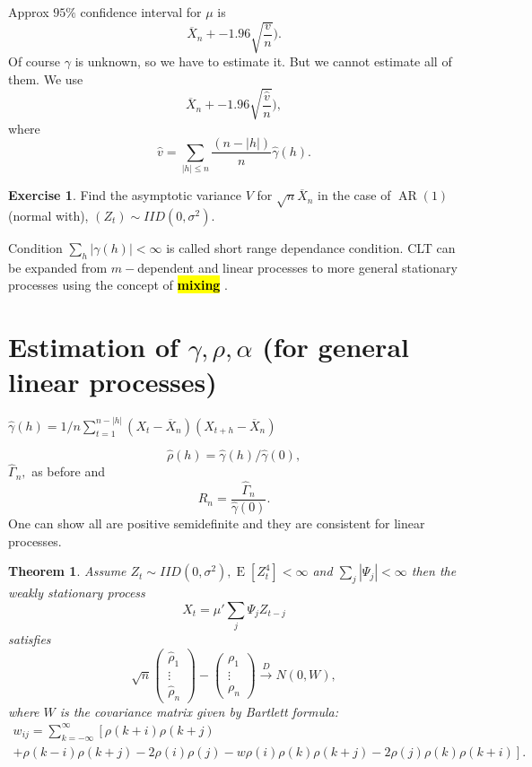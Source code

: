 \documentclass[12pt,a4paper, notitlepage]{book}
\newcommand{\hlc}[2][yellow]{ {\sethlcolor{#1} \hl{#2}} }
\newcommand{\hlcr}[1]{\hlc[lightred]{#1}}
\theoremstyle{definition} %
\newtheorem{exercise}{Exercise}[chapter]
\theoremstyle{plain} %
\newtheorem{theorem}{Theorem}
\DeclareMathOperator{\E}{E}
\DeclareMathOperator{\Ar}{AR}
\newcommand{\New}[1]{ {\bf \hlcr{#1} } }
\begin{document}
Approx $95\%$ confidence interval for $\mu$ is 
\[ \overline{X}_n +- 1.96 \sqrt{\frac{v}{n}}). \]
 Of course $\gamma$ is unknown, so we have to estimate it. But we cannot estimate all of them.
 We use 
\[ \overline{X}_n +- 1.96 \sqrt{\frac{\hat{v}}{n}}) , \]
 where  
\[ \hat{v} = \sum_{|h| \leq n} \frac{(n - |h|)}{n}\hat{\gamma}(h). \]


\begin{exercise}
Find the asymptotic variance $V$ for $\sqrt{n} \overline{X}_n$ in the case of $\Ar(1)$ (normal with), $(Z_t) \sim IID(0, \sigma^2)$.
\end{exercise}

Condition $\sum_h |\gamma(h)| < \infty$ is called short range dependance condition. CLT can be expanded from 
$m-$dependent and linear processes to more general stationary processes using the concept of \New{ mixing}. 

\section{Estimation of $\gamma, \rho, \alpha$ (for general linear processes)}

$\hat{\gamma}(h) = 1/n \sum_{t = 1}^{n - |h|} (X_t - \overline{X}_n)(X_{t+h}-\overline{X}_n)$

\[ \hat{\rho}(h) = \hat{\gamma}(h) / \hat{\gamma}(0) , \] 
 $\hat{\Gamma}_n , $
 as before and 
\[ \hat{R}_n = \frac{\hat{\Gamma}_n}{\hat{\gamma}(0)}. \]
 One can show all are positive semidefinite and they are consistent for linear processes.

\begin{theorem}
Assume $Z_t \sim IID(0, \sigma^2), \E[Z_t^4] < \infty$ and $\sum_j |\Psi_j| < \infty$ then the weakly stationary process 
\[ X_t = \mu ' \sum_j \Psi_j Z_{t-j} \]
satisfies
\[ \sqrt{n} \left( \begin{array}{c} \hat{\rho}_1 \\ \vdots \\ \hat{\rho}_n \end{array} \right) - 
\left( \begin{array}{c} \rho _1 \\ \vdots \\ \rho_n \end{array} \right)  \overset{D}{\rightarrow} N(0,W), \]
 where $W$ is the covariance matrix given by Bartlett formula:
\begin{align*}
 w_{i j} = \sum_{k = -\infty}^{\infty} \left[\rho(k + i)\rho(k+j) \right. \\
\left. + \rho(k-i) \rho(k+j)-2\rho(i)\rho(j)-w\rho(i)\rho(k)\rho(k+j) - 2\rho(j)\rho(k)\rho(k+i) \right] . 
\end{align*}

\end{theorem}
\end{document}
